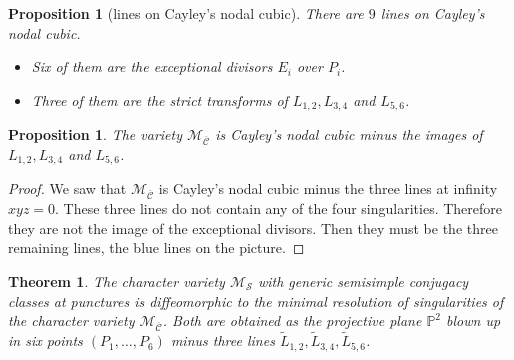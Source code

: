 \documentclass[11pt]{article}
\theoremstyle{definition}
\theoremstyle{plain}
\newtheorem{theorem}[definition]{Theorem}
\newtheorem{proposition}[definition]{Proposition}
\begin{document}
\begin{proposition}[lines on Cayley's nodal cubic]\label{prop_lines_cayley}
There are $9$ lines on Cayley's nodal cubic.
\begin{itemize}
\item Six of them are the exceptional divisors $E_i$ over $P_i$.
\item Three of them are the strict transforms of $L_{1,2}, L_{3,4}$ and $L_{5,6}$.
\end{itemize}
\end{proposition}
\begin{proposition}
The variety $\mathcal{M}_{\overline{\boldsymbol{\mathcal{C}}}}$ is Cayley's nodal cubic minus the images of $L_{1,2}, L_{3,4}$ and $L_{5,6}$.
\end{proposition}
\begin{proof}
We saw that $\mathcal{M}_{\overline{\boldsymbol{\mathcal{C}}}}$ is Cayley's nodal cubic minus the three lines at infinity $xyz=0$. These three lines do not contain any of the four singularities. Therefore they are not the image of the exceptional divisors. Then they must be the three remaining lines, the blue lines on the picture.
\end{proof}
\begin{theorem}
The character variety $\mathcal{M}_{\boldsymbol{\mathcal{S}}}$ with generic semisimple conjugacy classes at punctures is diffeomorphic to the minimal resolution of singularities of the character variety $\mathcal{M}_{\overline{\boldsymbol{\mathcal{C}}}}$. Both are obtained as the projective plane $\mathbb{P}^2$ blown up in six points $(P_1,\dots,P_6)$ minus three lines $\widetilde{L}_{1,2}, \widetilde{L}_{3,4}, \widetilde{L}_{5,6}$.
\end{theorem}
\end{document}
